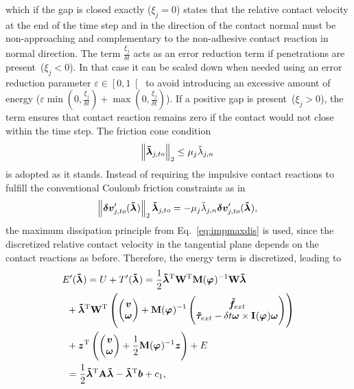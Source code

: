 \documentclass[global,twocolumn]{svjour}
\let\vec\bm
\newcommand{\vectoscalar}[1]{{\renewcommand{\vec}{}#1}}
\newcommand{\dt}{\ensuremath{\delta t}}
\newcommand{\intervalCO}[2]{\ensuremath{\left[ #1, #2 \right[}}
\newcommand{\mat}[1]{{\bf #1}}
\newcommand{\dvect}[2]{\ensuremath{\begin{pmatrix}#1\\#2\end{pmatrix}}}
\newcommand{\transp}{{\mathrm{T}}}
\newcommand{\cross}{\times}
\newcommand{\orient} [1]{\ensuremath{\vec{\varphi}_{#1}}}
\newcommand{\linvel} [1]{\ensuremath{\vec{v}_{#1}}}
\newcommand{\angvel} [1]{\ensuremath{\vec{\omega}_{#1}}}
\newcommand{\inertia}[1]{\ensuremath{\mat{I}_{#1}}}
\newcommand{\forceextapprox} [1]{\ensuremath{\vec{\tilde{f}}_{\ifstrequal{#1}{}{ext}{#1,ext}}}}
\newcommand{\torqueextapprox}[1]{\ensuremath{\vec{\tilde{\tau}}_{\ifstrequal{#1}{}{ext}{#1,ext}}}}
\newcommand{\cof}[1]{\ensuremath{\mu_{#1}}}
\newcommand{\contactforceapprox}[1]{\ensuremath{\vec{\tilde{\lambda}}_{#1}}}
\newcommand{\contactforceapproxCFn}[1]{\ensuremath{\vectoscalar{\contactforceapprox{\ifstrequal{#1}{}{n}{#1,n}}}}}
\newcommand{\contactforceapproxCFto}[1]{\ensuremath{\contactforceapprox{\ifstrequal{#1}{}{to}{#1,to}}}}
\newcommand{\primerelvel}[1]{\ensuremath{{\vec{\delta v}_{#1}'}}}
\newcommand{\primerelvelCFto}[1]{\ensuremath{\primerelvel{\ifstrequal{#1}{}{to}{#1,to}}}}
\begin{document}
			which if the gap is closed exactly ($\xi_j = 0$) states that the relative contact velocity at the end of the time step and in the
			direction of the contact normal must be non-approaching and complementary to the
			non-adhesive contact reaction in normal direction. The term $\frac{\xi_j}{\dt}$ acts as an error reduction term
			if penetrations are present~($\xi_j < 0$). In that case it can be scaled
			down when needed using an error reduction parameter $\varepsilon \in \intervalCO{0}{1}$
			to avoid introducing an excessive amount of energy ($\varepsilon \min(0, \frac{\xi_j}{\dt}) + \max(0, \frac{\xi_j}{\dt})$).
			If a positive gap is present~($\xi_j > 0$), the term ensures that contact reaction remains zero if the contact would not close within the time step.
			The friction cone condition
			\begin{equation*}
				\norm{\contactforceapproxCFto{j}}_2 \leq \cof{j} \contactforceapproxCFn{j}
			\end{equation*}
			is adopted as it stands. Instead of requiring the impulsive contact
			reactions to fulfill the conventional Coulomb friction constraints
			as in
			\begin{equation*}
				\norm{\primerelvelCFto{j}(\contactforceapprox{})}_2 \contactforceapproxCFto{j} = -\cof{j} \contactforceapproxCFn{j} \primerelvelCFto{j}(\contactforceapprox{}),
			\end{equation*}
			the maximum dissipation principle from Eq.~\eqref{eq:impmaxdis} is used, since
			the discretized relative contact velocity in the tangential plane depends on the contact
			reactions as before. Therefore, the energy term is discretized, leading to
			\begin{equation*}
				\begin{split}
					E'(\contactforceapprox{}) & = U + T'(\contactforceapprox{}) = \frac{1}{2} \contactforceapprox{}^\transp \mat{W}^\transp \mat{M}(\orient{})^{-1} \mat{W} \contactforceapprox{} \\
						& \hspace{-0.75cm} + \contactforceapprox{}^\transp \mat{W}^\transp \left( \dvect{\linvel{}}{\angvel{}} + \mat{M}(\orient{})^{-1} \dvect{\forceextapprox{}}{\torqueextapprox{} - \dt \angvel{} \cross \inertia{}(\orient{}) \angvel{}} \right) \\
						& \hspace{-0.75cm} + \vec z^\transp \left( \dvect{\linvel{}}{\angvel{}} + \frac{1}{2} \mat{M}(\orient{})^{-1} \vec z \right) + E \\
						& \hspace{-0.75cm} = \frac{1}{2} \contactforceapprox{}^\transp \mat{A} \contactforceapprox{} - \contactforceapprox{}^\transp \vec b + c_1,
				\end{split}
			\end{equation*}
\end{document}
